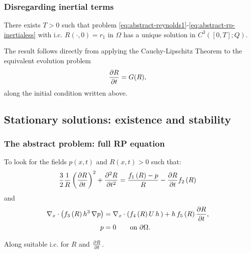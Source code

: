 \documentclass[10pt,aspectratio=169]{beamer}
\begin{document}

\begin{frame}\frametitle{Disregarding inertial terms}
\begin{theorem}There exists $T>0$ such that  problem \eqref{eq:abstract-reynolds1}-\eqref{eq:abstract-rp-inertialess} with i.c. $R\left(\cdot,0\right)=r_1$ in $\Omega$ has a unique solution in $C^3\left([0,T];Q\right)$.

\end{theorem}
The result follows directly from applying the Cauchy-Lipschitz Theorem to the equivalent evolution problem
\begin{equation}
\frac{\partial R}{\partial t}=G(R),\label{eq:ev-problem-G}
\end{equation}
along the initial condition written above.

\end{frame}


\subsection{Stationary solutions: existence and stability}
\begin{frame}
\tableofcontents[
currentsection,
currentsubsection,
subsectionstyle=show/shaded/hide
]
\end{frame}


\begin{frame}
\frametitle{The abstract problem: full RP equation}
To look for the fields $p(x,t)$ and $R(x,t)>0$ such that:
\begin{equation*}
\frac{3}{2}\frac{1}{R}\left(\frac{\partial R}{\partial t}\right)^2+\frac{\partial^2 R}{\partial t^2}=\frac{f_1\left(R\right)-p}{R}-\frac{\partial R}{\partial t}f_2\left(R\right)
\end{equation*}
and
\begin{align*}
\begin{split}
\nabla_x\cdot \left(f_3\left(R\right) h^3\,\nabla p\right)&=\nabla_x\cdot \left(f_4\left(R\right)U\,h\,\right)+h\,f_5\left(R\right)\frac{\partial R}{\partial t},\\
p&=0 \qquad\mbox{on } \partial \Omega.
\end{split}
\end{align*}

Along suitable i.c. for $R$ and $\frac{\partial R}{\partial t}$.


\end{frame} 
\end{document}
